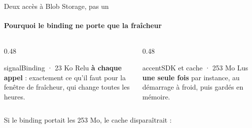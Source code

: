 \documentclass[aspectratio=169, 12pt, t]{beamer}
\begin{document}
\begin{frame}{Deux accès à Blob Storage, pas un}
  \framesubtitle{Pourquoi le binding ne porte que la fraîcheur}
  \begin{columns}[T]
    \begin{column}{0.48\textwidth}
      \begin{carte}{signal}{Binding · 23 Ko}
        Relu \textbf{à chaque appel} : exactement ce qu'il faut pour la fenêtre de fraîcheur, qui change toutes les heures.
      \end{carte}
    \end{column}
    \begin{column}{0.48\textwidth}
      \begin{carte}{accent}{SDK et cache · 253 Mo}
        Lus \textbf{une seule fois} par instance, au démarrage à froid, puis gardés en mémoire.
      \end{carte}
    \end{column}
  \end{columns}

  \vspace{1.1em}
  {\normalsize Si le binding portait les 253 Mo, le cache disparaîtrait :}

  \vspace{0.4em}
\end{frame}
\end{document}
